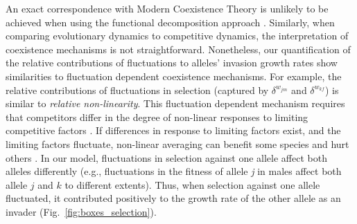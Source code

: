 \documentclass[12pt]{article}
\begin{document}
 An exact correspondence with Modern Coexistence Theory is unlikely to be achieved when using the functional decomposition approach \citep{ellner2016quantify,shoemaker2020}. Similarly, when comparing evolutionary dynamics to competitive dynamics, the interpretation of coexistence mechanisms is not straightforward. Nonetheless, our quantification of the relative contributions of fluctuations to alleles' invasion growth rates show similarities to fluctuation dependent coexistence mechanisms. For example, the relative contributions of fluctuations in selection (captured by $\delta^{w_{jm}}$ and $\delta^{w_{kf}}$) is similar to \textit{relative non-linearity}. This fluctuation dependent mechanism requires that competitors differ in the degree of non-linear responses to limiting competitive factors \citep{Chesson2000,zepeda2019fluctuation}. If differences in response to limiting factors exist, and the limiting factors fluctuate, non-linear averaging can benefit some species and hurt others \citep{ellner_expanded_2019}. In our model, fluctuations in selection against one allele affect both alleles differently (e.g., fluctuations in the fitness of allele \textit{j} in males affect both allele $j$ and $k$ to different extents). Thus, when selection against one allele fluctuated, it contributed positively to the growth rate of the other allele as an invader (Fig.~\ref{fig:boxes_selection}).



\end{document}
